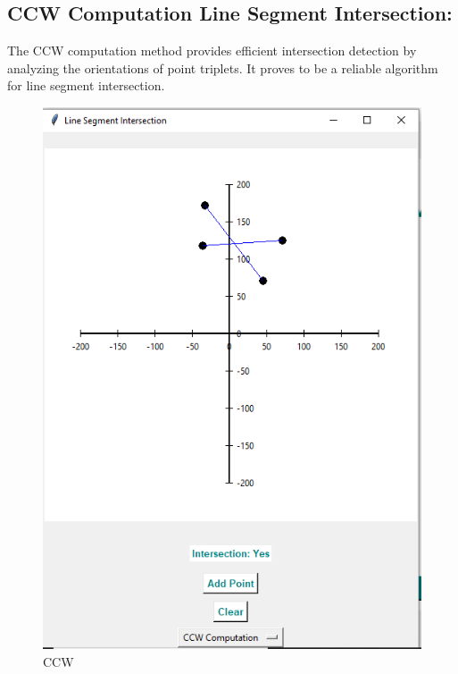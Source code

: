\subsection{\textbf{CCW Computation Line Segment Intersection:}}

The CCW computation method provides efficient intersection detection by analyzing the orientations of point triplets. It proves to be a reliable algorithm for line segment intersection.

\begin{figure}[h]
    \centering
    \includegraphics[width=1\linewidth]{ccw.PNG}
    \caption{CCW}
    \label{fig:ccw}
\end{figure}
